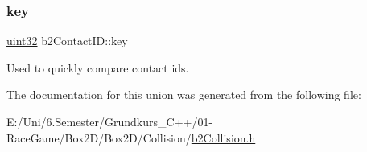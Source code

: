 \subsubsection{\texorpdfstring{key}{key}}
{\footnotesize\ttfamily \mbox{\hyperlink{b2_settings_8h_a1134b580f8da4de94ca6b1de4d37975e}{uint32}} b2\+Contact\+I\+D\+::key}



Used to quickly compare contact ids. 



The documentation for this union was generated from the following file\+:\begin{DoxyCompactItemize}
\item 
E\+:/\+Uni/6.\+Semester/\+Grundkurs\+\_\+\+C++/01-\/\+Race\+Game/\+Box2\+D/\+Box2\+D/\+Collision/\mbox{\hyperlink{b2_collision_8h}{b2\+Collision.\+h}}\end{DoxyCompactItemize}
